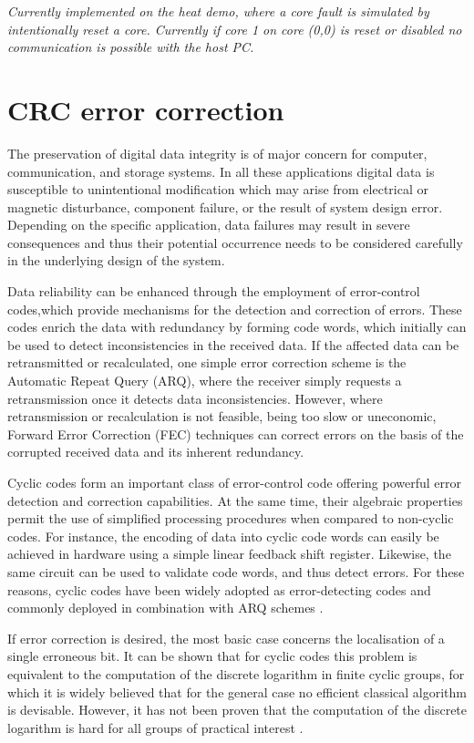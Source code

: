 \documentclass[a4paper, 11pt]{article}
\begin{document}
\emph{Currently implemented on the heat demo, where a core fault is simulated by intentionally reset a core. Currently if core 1 on core (0,0) is reset or disabled no communication is possible with the host PC.}


\clearpage
\section{CRC error correction}
\label{sec:crc}

The preservation of digital data integrity is of major concern for computer, communication, and storage systems. In all these applications digital data is susceptible to unintentional modification which may arise from electrical or magnetic disturbance, component failure, or the result of system design error. Depending on the specific application, data failures may result in severe consequences and thus their potential occurrence needs to be considered carefully in the underlying design of the system.

Data reliability can be enhanced through the employment of error-control codes,which provide mechanisms for the detection and correction of errors. These codes enrich the data with redundancy by forming code words, which initially can be used to detect inconsistencies in the received data. If the affected data can be retransmitted or recalculated, one simple error correction scheme is the Automatic Repeat Query (ARQ), where the receiver simply requests a retransmission once it detects data inconsistencies. However, where retransmission or recalculation is not feasible, being too slow or uneconomic, Forward Error Correction (FEC) techniques can correct errors on the basis of the corrupted received data and its inherent redundancy.

Cyclic codes form an important class of error-control code offering powerful error detection and correction capabilities. At the same time, their algebraic properties permit the use of simplified processing procedures when compared to non-cyclic codes. For instance, the encoding of data into cyclic code words can easily be achieved in hardware using a simple linear feedback shift register. Likewise, the same circuit can be used to validate code words, and thus detect errors. For these reasons, cyclic codes have been widely adopted as error-detecting codes and commonly deployed in combination with ARQ schemes \citep{grymel2013error}. 

If error correction is desired, the most basic case concerns the localisation of a single erroneous bit. It can be shown that for cyclic codes this problem is equivalent to the computation of the discrete logarithm in finite cyclic groups, for which it is widely believed that for the general case no efficient classical algorithm is devisable. However, it has not been proven that the computation of the discrete logarithm is hard for all groups of practical interest \citep{grymel2013error}.
\end{document}
